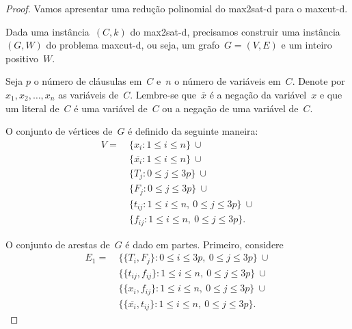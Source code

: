 	\begin{proof}
		Vamos apresentar uma redução polinomial do {\sc max2sat-d}
		para o {\sc maxcut-d}.

		Dada uma instância~$(C,k)$ do {\sc max2sat-d}, 
		precisamos construir uma instância~$(G,W)$
		do problema {\sc maxcut-d}, ou seja, um grafo~${G = (V,E)}$
		e um inteiro positivo~$W$.

		Seja $p$ o número de cláusulas em~$C$ e~$n$ o número de variáveis
		em~$C$.
		Denote por~${x_1,x_2,\ldots,x_n}$ as variáveis
		de~$C$.
		Lembre-se que~$\overline{x}$ é a negação da variável~$x$
		e que um literal de~$C$ é uma variável de~$C$ ou a 
		negação de uma variável de~$C$.

		O conjunto de vértices de~$G$ é definido da seguinte maneira:
		\begin{align}
			V = \ &\{x_i: 1\le i\le n\} \ \cup \nonumber\\
				&\{\overline{x_i}: 1\le i\le n\} \ \cup\nonumber\\ 
				&\{T_j: 0\le j\le 3p\} \ \cup \nonumber\\
				&\{F_j: 0\le j\le 3p\} \ \cup \nonumber\\
				&\{t_{ij}: 1\le i\le n,\ 0\le j\le 3p\} 
					\ \cup \nonumber\\
				&\{f_{ij}: 1\le i\le n,\ 0\le j\le 3p\}.\nonumber
		\end{align}

		\bigskip 

		O conjunto de arestas de~$G$ é dado em partes. 
		Primeiro, considere
		\begin{align}
			E_1= \ &\{ \{T_i,F_j\}: 0\le i\le 3p,\ 0\le j\le 3p\}\ \cup 
					\nonumber\\
				&\{\{t_{ij}, f_{ij}\}: 1\le i\le n,\ 
					0\le j\le 3p\}\ \cup \nonumber \\
				&\{\{x_i, f_{ij}\}: 1\le i\le n,\ 
					0\le j\le 3p\} \ \cup \nonumber \\
				&\{\{\overline{x_i}, t_{ij}\}: 1\le 
					i\le n,\ 0\le j\le 3p\}. \nonumber
		\end{align}


\end{proof}
